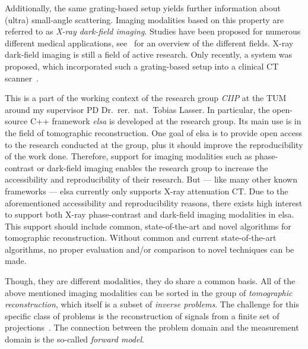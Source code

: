 Additionally, the same grating-based setup yields further information about (ultra) small-angle
scattering. Imaging modalities based on this property are referred to as \textit{X-ray dark-field
	imaging}. Studies have been proposed for numerous different medical applications,
see~\cite[Chapter 1.3.1]{wieczorek_anisotropic_2017} for an overview of the different fields. X-ray
dark-field imaging is still a field of active research. Only recently, a system was proposed, which
incorporated such a grating-based setup into a clinical CT scanner~\cite{viermetz_dark-field_2022}.

This is a part of the working context of the research group \textit{\gls{CIIP}} at the \gls{TUM}
around my supervisor PD Dr.\ rer.\ nat.\ Tobias Lasser. In particular, the open-source C++ framework
\textit{elsa} is developed at the research group. Its main use is in the field of tomographic
reconstruction. One goal of elsa is to provide open access to the research conducted at the group,
plus it should improve the reproducibility of the work done. Therefore, support for imaging
modalities such as phase-contrast or dark-field imaging enables the research group to increase the
accessibility and reproducibility of their research. But --- like many other known frameworks ---
elsa currently only supports X-ray attenuation CT\@. Due to the aforementioned accessibility and
reproducibility reasons, there exists high interest to support both X-ray phase-contrast and
dark-field imaging modalities in elsa. This support should include common, state-of-the-art and
novel algorithms for tomographic reconstruction. Without common and current state-of-the-art
algorithms, no proper evaluation and/or comparison to novel techniques can be made.

Though, they are different modalities, they do share a common basis. All of the above mentioned
imaging modalities can be sorted in the group of \textit{tomographic reconstruction}, which itself
is a subset of \textit{inverse problems}. The challenge for this specific class of problems is the
reconstruction of signals from a finite set of projections~\cite{herman_basis_2015}. The connection
between the problem domain and the measurement domain is the so-called \textit{forward model}.

